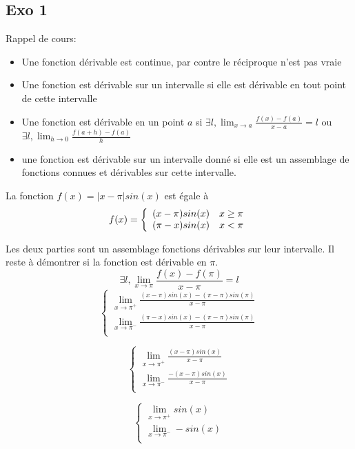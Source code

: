 \documentclass[]{book}
\theoremstyle{definition}
\begin{document}
\subsection*{Exo 1}
Rappel de cours:
\begin{itemize}
\item Une fonction d\'erivable est continue, par contre le r\'eciproque n'est pas vraie
\item Une fonction est d\'erivable sur un intervalle si elle est d\'erivable en tout point de cette intervalle
\item Une fonction est d\'erivable en un point $a$ si $\exists l, \lim_{x \to a}\frac{f(x)-f(a)}{x-a} = l$ ou $\exists l, \lim_{h \to 0}\frac{f(a+h)-f(a)}{h}$
\item une fonction est d\'erivable sur un intervalle donné si elle est un assemblage de fonctions connues et dérivables sur cette intervalle.
\end{itemize}

La fonction $f(x) = |x-\pi| sin(x)$ est \'egale \`a
$$f(x) = 
\left\{ 
\begin{array}{l l}
 (x-\pi) sin(x) & x \ge \pi \\
 (\pi-x) sin(x) & x < \pi \\
\end{array}
\right. 
$$

Les deux parties sont un assemblage fonctions d\'erivables sur leur intervalle. Il reste \`a d\'emontrer si la fonction est d\'erivable en $\pi$.
$$\exists l, \lim_{x \to \pi}\frac{f(x)-f(\pi)}{x-\pi} = l$$
$$ 
\left\{ 
\begin{array}{l}
 \lim_{x \to \pi^{+}}\frac{(x-\pi) sin(x) - (\pi-\pi) sin(\pi)}{x-\pi} \\
 \lim_{x \to \pi^{-}}\frac{(\pi-x) sin(x) - (\pi-\pi) sin(\pi)}{x-\pi} \\
\end{array}
\right. 
$$

$$ 
\left\{ 
\begin{array}{l}
 \lim_{x \to \pi^{+}}\frac{(x-\pi) sin(x)}{x-\pi} \\
 \lim_{x \to \pi^{-}}\frac{-(x-\pi) sin(x)}{x-\pi} \\
\end{array}
\right. 
$$

$$ 
\left\{ 
\begin{array}{l}
 \lim_{x \to \pi^{+}} sin(x) \\
 \lim_{x \to \pi^{-}} -sin(x) \\
\end{array}
\right. 
$$
\end{document}
